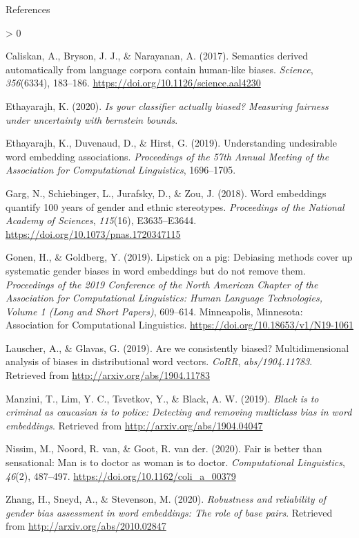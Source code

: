 \documentclass[
  10pt,
  ignorenonframetext,
  x11names, dvipsnames, bibspacing,natbib, table]{beamer}
\newlength{\cslhangindent}
\newenvironment{CSLReferences}[2] %
 {%
  \setlength{\parindent}{0pt}
  \ifodd #1 \everypar{\setlength{\hangindent}{\cslhangindent}}\ignorespaces\fi
  \ifnum #2 > 0
  \setlength{\parskip}{#2\baselineskip}
  \fi
 }%
 {}
\begin{document}
\begin{frame}{References}
\protect\hypertarget{references}{}
\tiny

\hypertarget{refs}{}
\begin{CSLReferences}{1}{0}
\leavevmode\hypertarget{ref-Caliskan2017semanticsBiases}{}%
Caliskan, A., Bryson, J. J., \& Narayanan, A. (2017). Semantics derived
automatically from language corpora contain human-like biases.
\emph{Science}, \emph{356}(6334), 183--186.
\url{https://doi.org/10.1126/science.aal4230}

\leavevmode\hypertarget{ref-Ethayarajh2020measuring}{}%
Ethayarajh, K. (2020). \emph{Is your classifier actually biased?
Measuring fairness under uncertainty with bernstein bounds}.

\leavevmode\hypertarget{ref-Ethayarajh2019understanding}{}%
Ethayarajh, K., Duvenaud, D., \& Hirst, G. (2019). Understanding
undesirable word embedding associations. \emph{Proceedings of the 57th
Annual Meeting of the Association for Computational Linguistics},
1696--1705.

\leavevmode\hypertarget{ref-Garg2018years}{}%
Garg, N., Schiebinger, L., Jurafsky, D., \& Zou, J. (2018). Word
embeddings quantify 100 years of gender and ethnic stereotypes.
\emph{Proceedings of the National Academy of Sciences}, \emph{115}(16),
E3635--E3644. \url{https://doi.org/10.1073/pnas.1720347115}

\leavevmode\hypertarget{ref-Gonen2019lipstick}{}%
Gonen, H., \& Goldberg, Y. (2019). Lipstick on a pig: {D}ebiasing
methods cover up systematic gender biases in word embeddings but do not
remove them. \emph{Proceedings of the 2019 Conference of the North
{A}merican Chapter of the Association for Computational Linguistics:
Human Language Technologies, Volume 1 (Long and Short Papers)},
609--614. Minneapolis, Minnesota: Association for Computational
Linguistics. \url{https://doi.org/10.18653/v1/N19-1061}

\leavevmode\hypertarget{ref-Lauscher2019multidimensional}{}%
Lauscher, A., \& Glavas, G. (2019). Are we consistently biased?
Multidimensional analysis of biases in distributional word vectors.
\emph{CoRR}, \emph{abs/1904.11783}. Retrieved from
\url{http://arxiv.org/abs/1904.11783}

\leavevmode\hypertarget{ref-Manzini2019blackToCriminal}{}%
Manzini, T., Lim, Y. C., Tsvetkov, Y., \& Black, A. W. (2019).
\emph{Black is to criminal as caucasian is to police: Detecting and
removing multiclass bias in word embeddings}. Retrieved from
\url{http://arxiv.org/abs/1904.04047}

\leavevmode\hypertarget{ref-Nissim2020fair}{}%
Nissim, M., Noord, R. van, \& Goot, R. van der. (2020). Fair is better
than sensational: Man is to doctor as woman is to doctor.
\emph{Computational Linguistics}, \emph{46}(2), 487--497.
\url{https://doi.org/10.1162/coli_a_00379}

\leavevmode\hypertarget{ref-zhang2020robustness}{}%
Zhang, H., Sneyd, A., \& Stevenson, M. (2020). \emph{Robustness and
reliability of gender bias assessment in word embeddings: The role of
base pairs}. Retrieved from \url{http://arxiv.org/abs/2010.02847}

\end{CSLReferences}
\end{frame}
\end{document}
